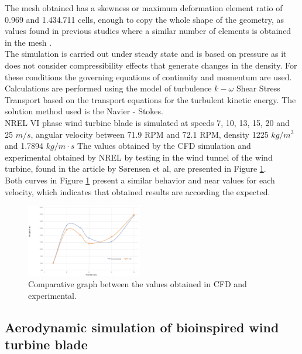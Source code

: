 The mesh obtained has a skewness or maximum deformation element  ratio of  0.969 and 1.434.711 cells, enough to copy the whole shape of the geometry, as values found in previous studies where a similar number of elements is obtained in the mesh \cite{nata}.\\

The simulation is carried out under steady state and is based on pressure as it does not consider compressibility effects that generate changes in the density. For these conditions the governing equations of continuity and momentum are used. Calculations are performed using the model of turbulence $k-\omega$ Shear Stress Transport based on the transport equations for the turbulent kinetic energy. The solution method used is the Navier - Stokes.\\

NREL VI phase wind turbine blade is simulated at speeds 7, 10, 13, 15, 20 and 25 $m/s$, angular velocity between 71.9 RPM and 72.1 RPM, density 1225 $kg/m^3$ and 1.7894 $kg/m\cdot s$ The values obtained by the CFD simulation and experimental obtained by NREL by testing in the wind tunnel of the wind turbine, found in the article by Sørensen et al, are presented in Figure \ref{fig:2}.\\ 

Both curves in Figure \ref{fig:2} present a similar behavior and near values for each velocity, which indicates that obtained results are according the expected. 
 

\begin{figure}[H]
\begin{center}
  \includegraphics[width=0.45\textwidth]{vali}%
\caption{Comparative graph between the values obtained in CFD and experimental.}
\label{fig:2}
\end{center}       %
\end{figure}

\subsection{Aerodynamic simulation of bioinspired wind turbine blade}

